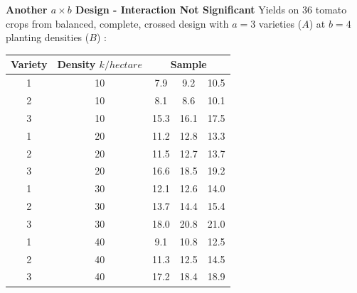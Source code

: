 \newpage
\textbf{Another $a \times b$ Design - Interaction Not Significant}
\bigkn 
Yields on $36$ tomato crops from balanced, complete, crossed design with $a=3$ varieties ($A$) at $b=4$ planting densities ($B$) :
\begin{center}
\begin{small}
\begin{tabular}{|cc|ccc|}  \hline
Variety & Density $k/hectare$ & \multicolumn{3}{c|}{Sample} \\ \hline
1 & 10 & 7.9 & 9.2 & 10.5 \\
2 & 10 & 8.1 & 8.6 & 10.1 \\
3 & 10 & 15.3 & 16.1 & 17.5 \\
1 & 20 & 11.2 & 12.8 & 13.3 \\
2 & 20 & 11.5 & 12.7 & 13.7 \\
3 & 20 & 16.6 & 18.5 & 19.2 \\
1 & 30 & 12.1 & 12.6 & 14.0 \\
2 & 30 & 13.7 & 14.4 & 15.4 \\
3 & 30 & 18.0 & 20.8 & 21.0 \\
1 & 40 & 9.1 & 10.8 & 12.5 \\
2 & 40 & 11.3 & 12.5 & 14.5 \\
3 & 40 & 17.2 & 18.4 & 18.9 \\ \hline
\end{tabular}
\end{small}
\end{center}

